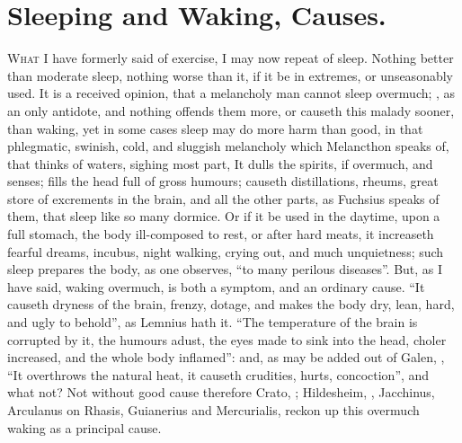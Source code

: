 \section{Sleeping and Waking, Causes.}

\lettrine{W}{hat} I have formerly said of exercise, I may now repeat of sleep.
Nothing better than moderate sleep, nothing worse than it, if it be in
extremes, or unseasonably used. It is a received opinion, that a melancholy man
cannot sleep overmuch; , as an only antidote,
and nothing offends them more, or causeth this malady sooner, than waking, yet
in some cases sleep may do more harm than good, in that phlegmatic, swinish,
cold, and sluggish melancholy which Melancthon speaks of, that thinks of
waters, sighing most part, \etc{} It dulls the spirits, if
overmuch, and senses; fills the head full of gross humours; causeth
distillations, rheums, great store of excrements in the brain, and all the
other parts, as Fuchsius speaks of them, that sleep like
so many dormice. Or if it be used in the daytime, upon a full stomach, the body
ill-composed to rest, or after hard meats, it increaseth fearful dreams,
incubus, night walking, crying out, and much unquietness; such sleep prepares
the body, as one observes, \enquote{to many perilous diseases}.
But, as I have said, waking overmuch, is both a symptom, and an ordinary cause.
\enquote{It causeth dryness of the brain, frenzy, dotage, and makes the body dry, lean,
hard, and ugly to behold}, as Lemnius hath it. \enquote{The
temperature of the brain is corrupted by it, the humours adust, the eyes made
to sink into the head, choler increased, and the whole body inflamed}: and, as
may be added out of Galen, ,
\Avicenna{}  \enquote{It overthrows the
natural heat, it causeth crudities, hurts, concoction}, and what not? Not
without good cause therefore Crato, ;
Hildesheim, , Jacchinus,
Arculanus on Rhasis, Guianerius and Mercurialis, reckon up this overmuch waking
as a principal cause.

